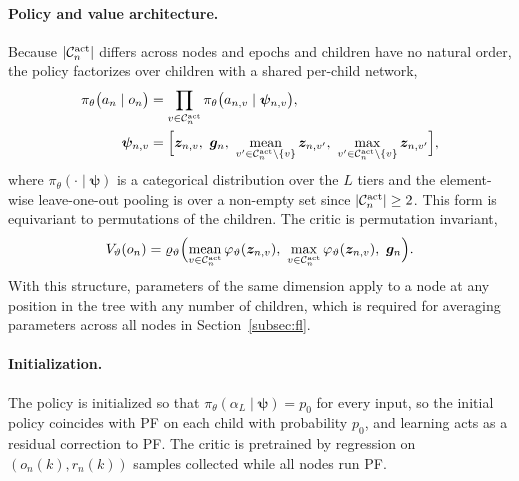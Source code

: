 \begin{EnChapter}
\paragraph{Policy and value architecture.}
Because $|\mathcal{C}_n^{\mathrm{act}}|$ differs across nodes and epochs and children have no
natural order, the policy factorizes over children with a shared per-child network,
\begin{align}
  \pi_\theta\bigl(a_n \mid o_n\bigr) &= \prod_{v \in \Cset_n^{\act}} \pi_\theta\bigl( a_{n,v} \mid \bm\psi_{n,v} \bigr), \label{eq:actor}\\
  \bm\psi_{n,v} &= \Bigl[ \bm z_{n,v},\ \bm g_n,\ \operatorname*{mean}_{v' \in \Cset_n^{\act} \setminus \{v\}} \bm z_{n,v'},\ \max_{v' \in \Cset_n^{\act} \setminus \{v\}} \bm z_{n,v'} \Bigr], \notag
\end{align}
where $\pi_\theta(\cdot \mid \bm\psi)$ is a categorical distribution over the $L$
tiers and the element-wise leave-one-out pooling is over a non-empty set since
$|\mathcal{C}_n^{\mathrm{act}}| \ge 2$. This form is equivariant to permutations of the children.
The critic is permutation invariant,
\begin{equation}
  V_\vartheta(o_n) = \varrho_\vartheta\Bigl( \operatorname*{mean}_{v \in \mathcal{C}_n^{\mathrm{act}}} \varphi_\vartheta(\bm z_{n,v}),\ \max_{v \in \mathcal{C}_n^{\mathrm{act}}} \varphi_\vartheta(\bm z_{n,v}),\ \bm g_n \Bigr).
  \label{eq:critic}
\end{equation}
With this structure, parameters of the same dimension apply to a node at any
position in the tree with any number of children, which is required for averaging
parameters across all nodes in Section~\ref{subsec:fl}.

\paragraph{Initialization.}
The policy is initialized so that $\pi_\theta(\alpha_L \mid \bm\psi) = p_0$ for every
input, so the initial policy coincides with PF on each child with probability $p_0$,
and learning acts as a residual correction to PF. The critic is pretrained by
regression on $(o_n(k), r_n(k))$ samples collected while all nodes run PF.


\end{EnChapter}
